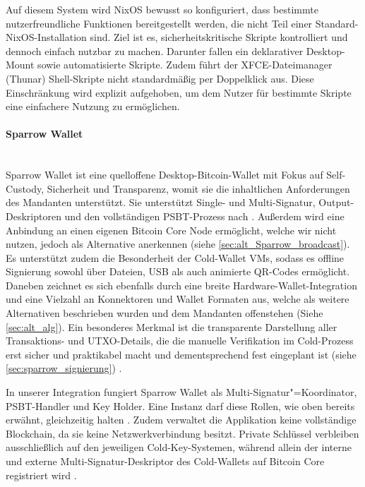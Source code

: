 Auf diesem System wird NixOS bewusst so konfiguriert, dass bestimmte nutzerfreundliche Funktionen bereitgestellt werden, die nicht Teil einer Standard-NixOS-Installation sind. Ziel ist es, sicherheitskritische Skripte kontrolliert und dennoch einfach nutzbar zu machen.
Darunter fallen ein deklarativer Desktop-Mount sowie automatisierte Skripte. Zudem führt der \ac{XFCE}-Dateimanager (Thunar) Shell-Skripte nicht standardmäßig per Doppelklick aus. Diese Einschränkung wird explizit aufgehoben, um dem Nutzer für bestimmte Skripte eine einfachere Nutzung zu ermöglichen.

\paragraph{Sparrow Wallet} \mbox{}\\
Sparrow Wallet ist eine quelloffene Desktop-Bitcoin-Wallet mit Fokus auf Self-Custody, Sicherheit und Transparenz, womit sie die inhaltlichen Anforderungen des Mandanten unterstützt. Sie unterstützt Single- und Multi-Signatur, Output-Deskriptoren und
den vollständigen \ac{PSBT}-Prozess nach \cite{bip174}. 
Außerdem wird eine Anbindung an einen eigenen Bitcoin Core Node ermöglicht, welche wir nicht nutzen, jedoch als Alternative anerkennen (siehe \ref{sec:alt_Sparrow_broadcast}). 
Es unterstützt zudem die Besonderheit der Cold-Wallet \acp{VM}, sodass es offline Signierung sowohl über Dateien, \ac{USB} als auch animierte \ac{QR}-Codes ermöglicht. Daneben zeichnet es sich ebenfalls durch eine breite Hardware-Wallet-Integration und eine Vielzahl an Konnektoren und Wallet Formaten aus, welche als weitere Alternativen beschrieben wurden und dem Mandanten offenstehen (Siehe \ref{sec:alt_alg}).
Ein besonderes Merkmal ist die transparente Darstellung aller Transaktions- und \ac{UTXO}-Details, die die manuelle Verifikation im Cold-Prozess erst sicher und praktikabel macht und dementsprechend fest eingeplant ist (siehe \ref{sec:sparrow_signierung}) \cite{sparrow_docs,Sparrow_Wallets_Features}.

In unserer Integration fungiert Sparrow Wallet als Multi-Signatur"=Koordinator, \ac{PSBT}-Handler und Key Holder. Eine Instanz darf diese Rollen, wie oben bereits erwähnt, gleichzeitig halten \cite{sparrow_docs,sparrow_multisig}.
Zudem verwaltet die Applikation keine vollständige Blockchain, da sie keine Netzwerkverbindung besitzt. Private Schlüssel verbleiben ausschließlich auf den jeweiligen Cold-Key-Systemen, während allein der interne und externe Multi-Signatur-Deskriptor des Cold-Wallets auf Bitcoin Core registriert wird \cite{sparrow_multisig, airgap_psbt_guide}.

